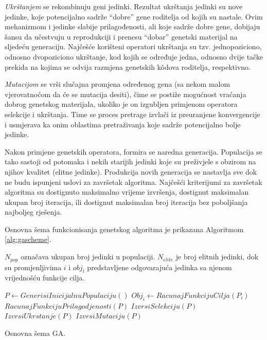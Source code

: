 \documentclass[a4paper, utf8, 11pt, colorlinks]{book}
\theoremstyle{definition}
\begin{document}
\emph{Ukrštanjem} se rekombinuju geni jedinki. Rezultat ukrštanja jedinki su nove jedinke, koje potencijalno sadrže ``dobre'' gene  roditelja od kojih su nastale. Ovim mehanizmom  i jedinke slabije prilagođenosti, ali koje sadrže dobre gene, dobijaju šansu da učestvuju u reprodukciji i prenesu ``dobar'' genetski materijal na sljedeću generaciju. Najčešće korišteni operatori ukrštanja su tzv. jednopoziciono, odnosno dvopoziciono ukrštanje, kod kojih se određuje jedna, odnosno dvije tačke prekida na kojima se odvija razmjena genetskih k\^odova roditelja, respektivno.

\emph{Mutacijom} se vrši slučajna promjena određenog gena (sa nekom malom vjerovatnoćom da će se mutacija desiti), čime se postiže mogućnost vraćanja dobrog genetskog materijala, ukoliko je on izgubljen primjenom operatora selekcije i ukrštanja. Time se proces pretrage izvlači iz preuranjene konvergencije i usmjerava ka onim oblastima pretraživanja koje sadrže potencijalno bolje jedinke.


Nakon primjene genetskih operatora, formira se naredna generacija. Populacija se tako sastoji od potomaka i nekih starijih jedinki koje su preživjele s obzirom na njihov kvalitet (elitne jedinke). Produkcija novih generacija se nastavlja sve dok ne budu ispunjeni uslovi za završetak algoritma. Najčešći kriterijumi za završetak algoritma su dostignuto maksimalno vrijeme izvršenja, dostignut  maksimalan ukupan broj iteracija, ili dostignut maksimalan broj iteracija bez poboljšanja najboljeg rješenja.

Osnovna šema funkcionisanja genetskog algoritma je prikazana Algoritmom \ref{alg:gascheme}.

$N_{pop}$ označava ukupan broj jedinki u populaciji.  $N_{elite}$ je broj elitnih jedinki, dok su promjenljivima  $i$ i $obj_{i}$ predstavljene odgovarajuća jedinka sa njenom vrijednošću funkcije cilja.

\begin{algorithm}
	\begin{algorithmic}[1]
		 \STATE  $ P \gets GenerisiInicijalnuPopulaciju()$
		            \STATE $Obj_i \gets RacunajFunkcijuCilja(P_i)$
		       \ENDFOR
		       \STATE $RacunajFunkcijuPrilagodjenosti(P)$
		       \STATE $IzvrsiSelekciju(P)$
		       \STATE $IzvrsiUkrstanje(P)$		  
		       \STATE $IzvrsiMutaciju(P)$
		 \ENDWHILE
	\end{algorithmic}
    \caption{Osnovna šema GA.}
    \label{alg:gascheme}
\end{algorithm}
\end{document}
